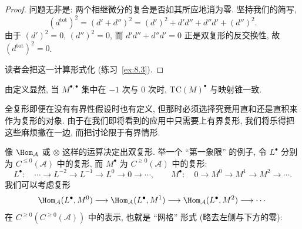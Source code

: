 \begin{proof}
问题无非是: 两个相继微分的复合是否如其所应地消为零. 坚持我们的简写,
\[
(d^{\mathrm{tot}})^2=(d'+d'')^2=(d')^2+d'd''+d''d'+(d'')^2.
\]
由于 $(d')^2=0$, $(d'')^2=0$, 而 $d'd''+d''d'=0$ 正是双复形的反交换性, 故 $(d^{\mathrm{tot}})^2=0$.

读者会把这一计算形式化 (练习~\ref{ex:8.3}).
\end{proof}

由定义显然, 当 $M^{\bullet,\bullet}$ 集中在 $-1$ 次与 $0$ 次时, $\mathrm{TC}(M)^\bullet$ 与映射锥一致.

全复形即便在没有有界性假设时也有定义, 但那时必须选择究竟用直和还是直积来作为复形的对象. 由于在我们即将看到的应用中只需要上有界复形, 我们将乐得把这些麻烦撇在一边, 而把讨论限于有界情形.

\begin{example}\label{ex:8.8-hom-tensor}
像 $\Hom_{\mathcal{A}}$ 或 $\otimes$ 这样的运算决定出双复形. 举一个 ``第一象限'' 的例子, 令 $L^\bullet$ 分别为 $C^{\le 0}(\mathcal{A})$ 中的复形, 而 $M^\bullet$ 为 $C^{\ge 0}(\mathcal{A})$ 中的复形:
\[
L^\bullet:\quad\cdots\longrightarrow L^{-2}\longrightarrow L^{-1}\longrightarrow L^0\longrightarrow 0\longrightarrow\cdots,
\qquad
M^\bullet:\quad 0\longrightarrow M^0\longrightarrow M^1\longrightarrow M^2\longrightarrow\cdots .
\]
我们可以考虑复形
\[
\Hom_{\mathcal A}(L^\bullet,M^0)\longrightarrow
\Hom_{\mathcal A}(L^\bullet,M^1)\longrightarrow
\Hom_{\mathcal A}(L^\bullet,M^2)\longrightarrow\cdots
\]
在 $C^{\ge 0}(C^{\ge 0}(\mathcal{A}))$ 中的表示, 也就是 ``网格'' 形式 (略去左侧与下方的零):
\begin{center}

\end{center}
\end{example}
